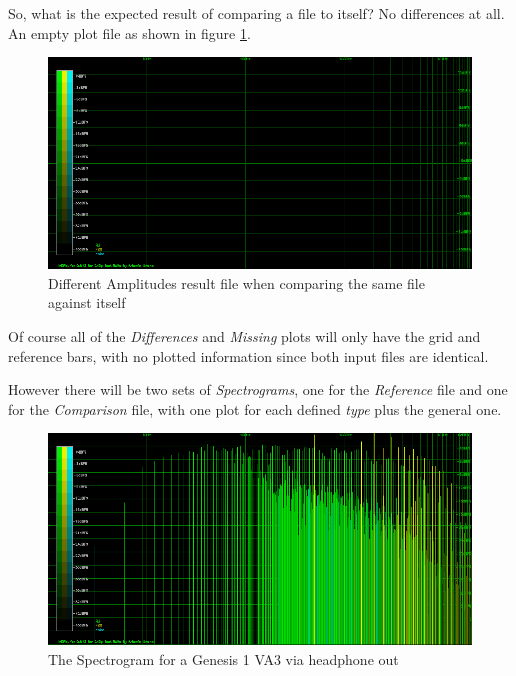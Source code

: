 \documentclass[10pt,a4paper]{report}
\begin{document}
So, what is the expected result of comparing a file to itself? No differences at all. An empty plot file as shown in figure \ref{fig:plot1-samefile}.

\begin{figure}[H]
	\centering
	\includegraphics[width=1.0\linewidth]{images/interpretation/Plot1-SameFile.png}
	\caption[Same file compared]{Different Amplitudes result file when comparing the same file against itself}
	\label{fig:plot1-samefile}
\end{figure}

Of course all of the \textit{Differences} and \textit{Missing} plots will only have the grid and reference bars, with no plotted information since both input files are identical. 

However there will be two sets of \textit{Spectrograms}, one for the \textit{Reference} file and one for the \textit{Comparison} file, with one plot for each defined \textit{type} plus the general one.

\begin{figure}[H]
	\centering
	\includegraphics[width=1.0\linewidth]{images/interpretation/Plot2-SameFile-FM-Spectrogram.png}
	\caption[Spectrogram]{The Spectrogram for a Genesis 1 VA3 via headphone out}
	\label{fig:plot2-samefile-fm-spectrogram}
\end{figure}
\end{document}
